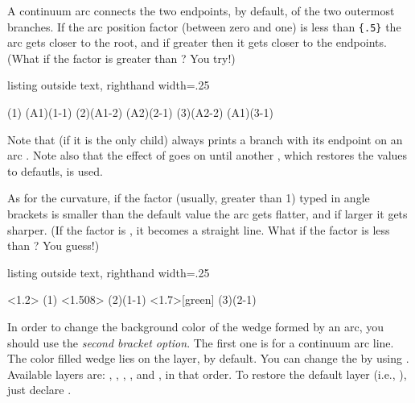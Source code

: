 A continuum arc connects the two endpoints, by default, of the two outermost branches.
If the arc position factor (between zero and one) is less than \verb+{.5}+ the arc gets closer to the root, and if greater then it gets closer to the endpoints.
(What if the factor is greater than ? You try!)

\begin{tcblisting}{listing outside text, righthand width=.25\linewidth}
\begin{istgame}
\cntmdistance*{10mm}{20mm}
\istrootcntmA(1)
  \istbA       \endist
\istroot(A1)(1-1)
  \istb \istb  \endist
{} 
\istrootcntmA(2)(A1-2)
  \istb        \endist
\istroot(A2)(2-1)
  \istb \istb  \endist
\cntmApreset %
\istrootcntmA(3)(A2-2)
  \istbA       \endist
\istroot(A1)(3-1)
  \istb \istb  \endist
\end{istgame}
\end{tcblisting}

Note that \cmd{\istbA} (if it is the only child) always prints a branch with its endpoint on an arc .
Note also that the effect of \icmd{\cntmApreset} goes on until another \cmd{\cntmApreset}, which restores the values to defautls, is used.


As for the curvature, if the factor (usually, greater than 1) typed in angle brackets is smaller than the default value  the arc gets flatter, and if larger it gets sharper. (If the factor is , it becomes a straight line. What if the factor is less than ? You guess!)

\begin{tcblisting}{listing outside text, righthand width=.25\linewidth}
\begin{istgame}
\cntmdistance*{10mm}{20mm}
\cntmApreset<1.2>
\istrootcntmA(1)
  \istbA        \endist
\cntmApreset[tension=1.12]<1.508>
\istrootcntmA(2)(1-1)
  \istbA        \endist
\cntmApreset<1.7>[green]
\istrootcntmA(3)(2-1)
  \istbA*       \endist
\end{istgame}
\end{tcblisting}


In order to change the background color of the wedge formed by an arc, you should use the \emph{second bracket option}.
The first one is for a continuum arc line.
The color filled wedge lies on the  layer, by default. 
You can change the  by using \icmd{\cntmAlayerpreset}.
Available layers are: , , , , and , in that order.
To restore the default layer (i.e., ), just declare \cmd{\cntmAlayerpreset}.

